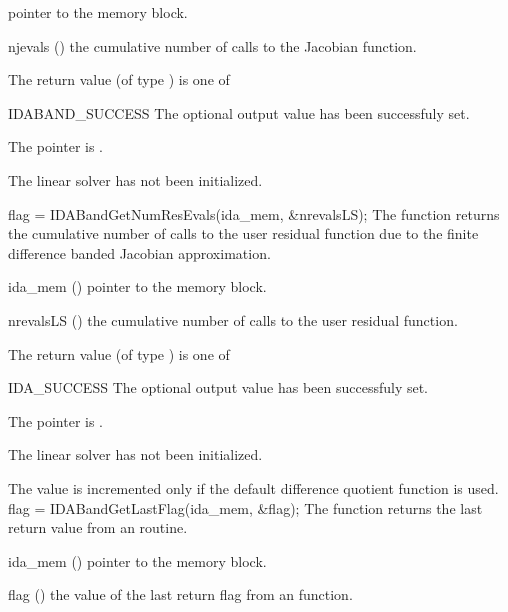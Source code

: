 {{\begin{args}[njevals]
    pointer to the {\ida} memory block.
  \item[njevals] ()
    the cumulative number of calls to the Jacobian function.
  \end{args}
}
{
  The return value  (of type ) is one of
  \begin{args}
  \item[IDABAND\_SUCCESS] 
    The optional output value has been successfuly set.
  \item[\Id{IDABAND\_MEM\_NULL}]
    The  pointer is .
  \item[\Id{IDABAND\_LMEM\_NULL}]
    The {\idaband} linear solver has not been initialized.
  \end{args}
}
{}
{
  flag = IDABandGetNumResEvals(ida\_mem, \&nrevalsLS);
}
{
  The function  returns the
  cumulative number of calls to the user residual function due to the 
  finite difference banded Jacobian approximation.
}
{
  \begin{args}[nrevalsLS]
  \item[ida\_mem] ()
    pointer to the {\ida} memory block.
  \item[nrevalsLS] ()
    the cumulative number of calls to the user residual function.
  \end{args}
}
{
  The return value  (of type ) is one of
  \begin{args}
  \item[IDA\_SUCCESS] 
    The optional output value has been successfuly set.
  \item[\Id{IDABAND\_MEM\_NULL}]
    The  pointer is .
  \item[\Id{IDABAND\_LMEM\_NULL}]
    The {\idaband} linear solver has not been initialized.
  \end{args}
}
{
  The value  is incremented only if the default 
   difference quotient function is used.
}
{
  flag = IDABandGetLastFlag(ida\_mem, \&flag);
}
{
  The function  returns the
  last return value from an {\idaband} routine. 
}
{
  \begin{args}
  \item[ida\_mem] ()
    pointer to the {\ida} memory block.
  \item[flag] ()
    the value of the last return flag from an {\idaband} function.

\end{args}}}
